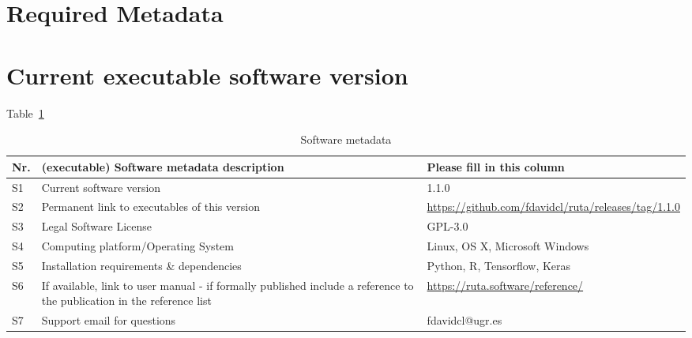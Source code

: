 






\section*{Required Metadata}

\section*{Current executable software version}

Table~\ref{p2tbl.exe}

\begin{table}[!h]
\begin{tabular}{|l|p{6.5cm}|p{6.5cm}|}
\hline
\textbf{Nr.} & \textbf{(executable) Software metadata description} & \textbf{Please fill in this column} \\
\hline
S1 & Current software version & 1.{1.0} \\
\hline
S2 & Permanent link to executables of this version  & {\url{https://github.com/fdavidcl/ruta/releases/tag/1.1.0}} \\
\hline
S3 & Legal Software License & GPL-3.0 \\
\hline
S4 & Computing platform/Operating System & Linux, OS X, Microsoft Windows \\
\hline
S5 & Installation requirements \& dependencies & Python, R, Tensorflow, Keras \\
\hline
S6 & If available, link to user manual - if formally published include a reference to the publication in the reference list & \url{https://ruta.software/reference/} \\
\hline
S7 & Support email for questions & fdavidcl@ugr.es \\
\hline
\end{tabular}
\caption{Software metadata}
\label{p2tbl.exe} 
\end{table}

